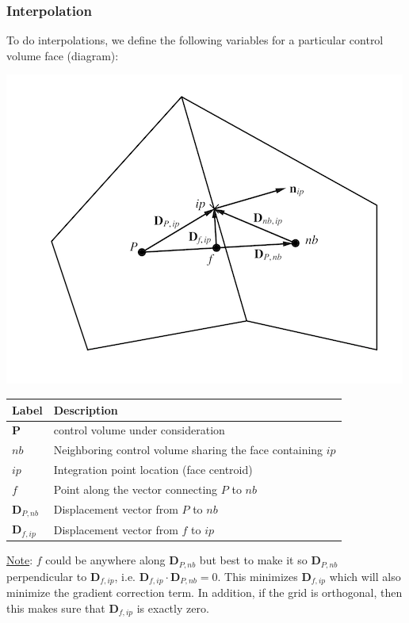 \documentclass[11pt]{article}
\begin{document}
\subsubsection{Interpolation}
\label{sec:org9b4367c}
To do interpolations, we define the following variables for a particular control volume face (diagram):
\begin{center}
\includegraphics[scale=1.7]{../pic/NotationDiagram.png}
\end{center}
\begin{center}
\begin{tabular}{ll}
Label & Description\\
\hline
\textbf{P} & control volume under consideration\\
\(nb\) & Neighboring control volume sharing the face containing \(ip\)\\
\(ip\) & Integration point location (face centroid)\\
\(f\) & Point along the vector connecting \(P\) to \(nb\)\\
\(\textbf{D}_{P,nb}\) & Displacement vector from \(P\) to \(nb\)\\
\(\textbf{D}_{f,ip}\) & Displacement vector from \(f\) to \(ip\)\\
\hline
\end{tabular}
\end{center}

\uline{Note}: \(f\) could be anywhere along \(\textbf{D}_{P,nb}\) but best to make it so \(\textbf{D}_{P,nb}\)
perpendicular to \(\textbf{D}_{f,ip}\), i.e. \(\textbf{D}_{f,ip} \cdot \textbf{D}_{P,nb} = 0\). This minimizes
\(\textbf{D}_{f,ip}\) which will also minimize the gradient correction term. In addition,
if the grid is orthogonal, then this makes sure that \(\textbf{D}_{f,ip}\) is exactly zero.
\end{document}
